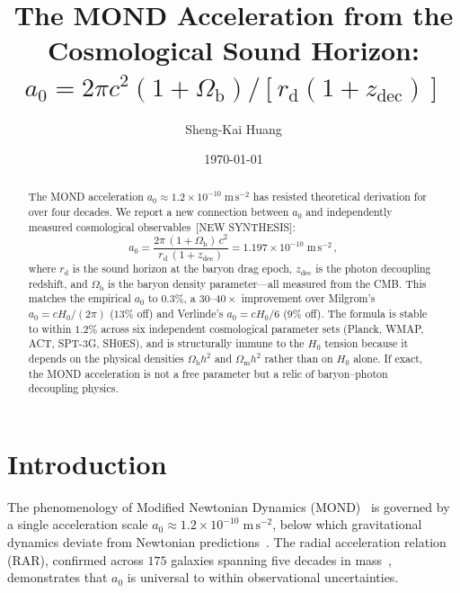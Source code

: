 \documentclass[prl,twocolumn,superscriptaddress,longbibliography]{revtex4-2}
\newcommand{\zdec}{z_{\mathrm{dec}}}
\newcommand{\rd}{r_{\mathrm{d}}}
\newcommand{\Ob}{\Omega_{\mathrm{b}}}
\newcommand{\Om}{\Omega_{\mathrm{m}}}
\newcommand{\azero}{a_0}
\newcommand{\ms}{\mathrm{m\,s}^{-2}}
\begin{document}
\title{The MOND Acceleration from the Cosmological Sound Horizon:\\
$\azero = 2\pi c^2(1+\Ob)/[\rd(1+\zdec)]$}

\author{Sheng-Kai Huang}

\date{\today}

\begin{abstract}
The MOND acceleration $\azero \approx 1.2 \times 10^{-10}\;\ms$
has resisted theoretical derivation for over four decades.
We report a new connection between $\azero$ and independently
measured cosmological observables~[NEW SYNTHESIS]:
\begin{equation*}
  \azero
  = \frac{2\pi\,(1 + \Ob)\,c^2}{\rd\,(1 + \zdec)}
  = 1.197 \times 10^{-10}\;\ms \,,
\end{equation*}
where $\rd$ is the sound horizon at the baryon drag epoch,
$\zdec$ is the photon decoupling redshift, and $\Ob$ is the
baryon density parameter---all measured from the CMB.
This matches the empirical $\azero$ to $0.3\%$, a
$30$--$40\times$ improvement over Milgrom's
$\azero = cH_0/(2\pi)$ ($13\%$ off) and Verlinde's
$\azero = cH_0/6$ ($9\%$ off).
The formula is stable to within $1.2\%$ across six
independent cosmological parameter sets (Planck, WMAP, ACT,
SPT-3G, SH0ES), and is structurally immune to the
$H_0$ tension because it depends on the physical densities
$\Ob h^2$ and $\Om h^2$ rather than on $H_0$ alone.
If exact, the MOND acceleration is not a free parameter
but a relic of baryon--photon decoupling physics.
\end{abstract}

\maketitle


\section{Introduction}
\label{sec:intro}

The phenomenology of Modified Newtonian Dynamics
(MOND)~\cite{Milgrom1983} is governed by a single acceleration
scale $\azero \approx 1.2 \times 10^{-10}\;\ms$, below which
gravitational dynamics deviate from Newtonian
predictions~\cite{Milgrom1983,BM1984}.
The radial acceleration relation (RAR), confirmed
across $175$ galaxies spanning five decades in
mass~\cite{McGaugh2016,Lelli2017}, demonstrates that
$\azero$ is universal to within observational
uncertainties.
\end{document}
